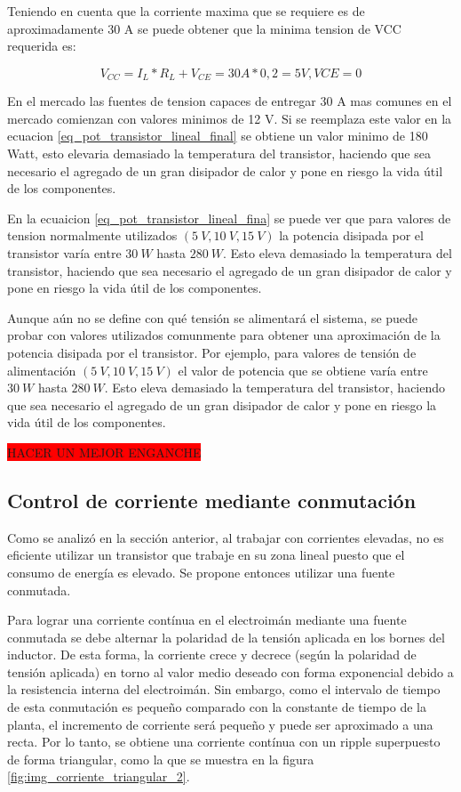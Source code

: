 Teniendo en cuenta que la corriente maxima que se requiere es de aproximadamente 30 A se puede obtener que la minima tension de VCC requerida es:

\begin{equation}
	V_{CC}=I_L*R_L+V_{CE}=30 A * 0,2  = 5 V, VCE=0
\end{equation}

En el mercado las fuentes de tension capaces de entregar 30 A mas comunes en el mercado comienzan con valores minimos de 12 V. Si se reemplaza este valor en la ecuacion  \ref{eq_pot_transistor_lineal_final} se obtiene un valor minimo de 180 Watt, esto elevaria demasiado la temperatura del transistor, haciendo que sea necesario el agregado de un gran disipador de calor y pone en riesgo la vida útil de los componentes.
  
En la ecuaicion \ref{eq_pot_transistor_lineal_fina} se puede ver que para valores de tension normalmente utilizados $(5\:V,10\:V,15\:V)$ la potencia disipada por el transistor varía entre $30\:W$ hasta $280\:W$. Esto eleva demasiado la temperatura del transistor, haciendo que sea necesario el agregado de un gran disipador de calor y pone en riesgo la vida útil de los componentes.

Aunque aún no se define con qué tensión se alimentará el sistema, se puede probar con valores utilizados comunmente para obtener una aproximación de la potencia disipada por el transistor. Por ejemplo, para valores de tensión de alimentación $(5\:V,10\:V,15\:V)$ el valor de potencia que se obtiene varía entre $30\:W$ hasta $280\:W$. Esto eleva demasiado la temperatura del transistor, haciendo que sea necesario el agregado de un gran disipador de calor y pone en riesgo la vida útil de los componentes.

\colorbox{red}{HACER UN MEJOR ENGANCHE}

\subsection{Control de corriente mediante conmutación}

Como se analizó en la sección anterior, al trabajar con corrientes elevadas, no es eficiente utilizar un transistor que trabaje en su zona lineal puesto que el consumo de energía es elevado. Se propone entonces utilizar una fuente conmutada.

\noindent Para lograr una corriente contínua en el electroimán mediante una fuente conmutada se debe alternar la polaridad de la tensión aplicada en los bornes del inductor. De esta forma, la corriente crece y decrece (según la polaridad de tensión aplicada) en torno al valor medio deseado con forma exponencial debido a la resistencia interna del electroimán. Sin embargo, como el intervalo de tiempo de esta conmutación es pequeño comparado con la constante de tiempo de la planta, el incremento de corriente será pequeño y puede ser aproximado a una recta. Por lo tanto, se obtiene una corriente contínua con un ripple superpuesto de forma triangular, como la que se muestra en la figura \ref{fig:img_corriente_triangular_2}. 

